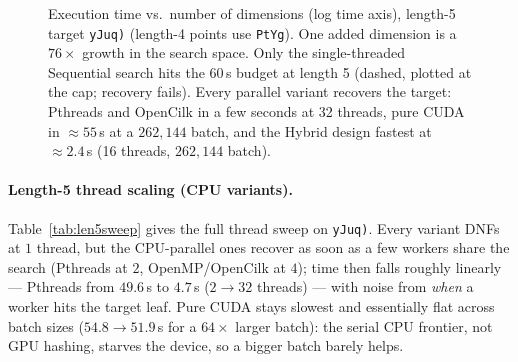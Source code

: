 \documentclass[11pt,a4paper]{article}
\begin{document}
\begin{figure}[H]
\centering
{}
\caption{Execution time vs.\ number of dimensions (log time axis), length-5 target \texttt{yJuq)}
(length-4 points use \texttt{PtYg}). One added dimension is a $76\times$ growth in the search space.
Only the single-threaded Sequential search hits the 60\,s budget at length 5 (dashed, plotted at the
cap; recovery fails). Every parallel variant recovers the target: Pthreads and OpenCilk in a few
seconds at 32 threads, pure CUDA in $\approx\!55$\,s at a $262{,}144$ batch, and the Hybrid design
fastest at $\approx\!2.4$\,s (16 threads, $262{,}144$ batch).}
\label{fig:dims}
\end{figure}

\vspace{-0.2cm}
\paragraph{Length-5 thread scaling (CPU variants).} Table~\ref{tab:len5sweep} gives the full
thread sweep on \texttt{yJuq)}. Every variant DNFs at $1$ thread, but the CPU-parallel ones recover
as soon as a few workers share the search (Pthreads at $2$, OpenMP/OpenCilk at $4$); time then falls
roughly linearly --- Pthreads from $49.6$\,s to $4.7$\,s ($2\!\to\!32$ threads) --- with noise from
\emph{when} a worker hits the target leaf. Pure CUDA stays slowest and essentially flat across batch
sizes ($54.8\!\to\!51.9$\,s for a $64\times$ larger batch): the serial CPU frontier, not GPU hashing,
starves the device, so a bigger batch barely helps.
\end{document}
